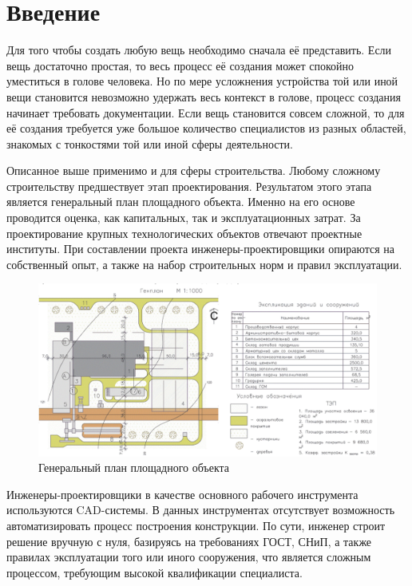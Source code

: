 \section*{\Large{Введение}}


Для того чтобы создать любую вещь необходимо сначала её представить.
Если вещь достаточно простая, то весь процесс её создания может спокойно уместиться в голове человека.
Но по мере усложнения устройства той или иной вещи становится невозможно удержать весь контекст в голове,
процесс создания начинает требовать документации.
Если вещь становится совсем сложной, то для её создания требуется уже большое количество специалистов из разных
областей, знакомых с тонкостями той или иной сферы деятельности.

Описанное выше применимо и для сферы строительства.
Любому сложному строительству предшествует этап проектирования.
Результатом этого этапа является генеральный план площадного объекта.
Именно на его основе проводится оценка, как капитальных, так и эксплуатационных затрат.
За проектирование крупных технологических объектов отвечают проектные институты.
При составлении проекта инженеры-проектировщики опираются на собственный опыт, а также на набор строительных норм
и правил эксплуатации.

\begin{figure}
    \vspace*{-1.2cm}
    \begin{center}
        \includegraphics[width=\textwidth]{introduction/pictures/site_plan}
    \end{center}
    \caption{Генеральный план площадного объекта}
    \label{pic:introduction__site-plan}
\end{figure}
Инженеры-проектировщики в качестве основного рабочего инструмента используются CAD-системы.
В данных инструментах отсутствует возможность автоматизировать процесс построения конструкции.
По сути, инженер строит решение вручную с нуля, базируясь на требованиях ГОСТ, СНиП, а также правилах
эксплуатации того или иного сооружения, что является сложным процессом, требующим высокой квалификации специалиста.
